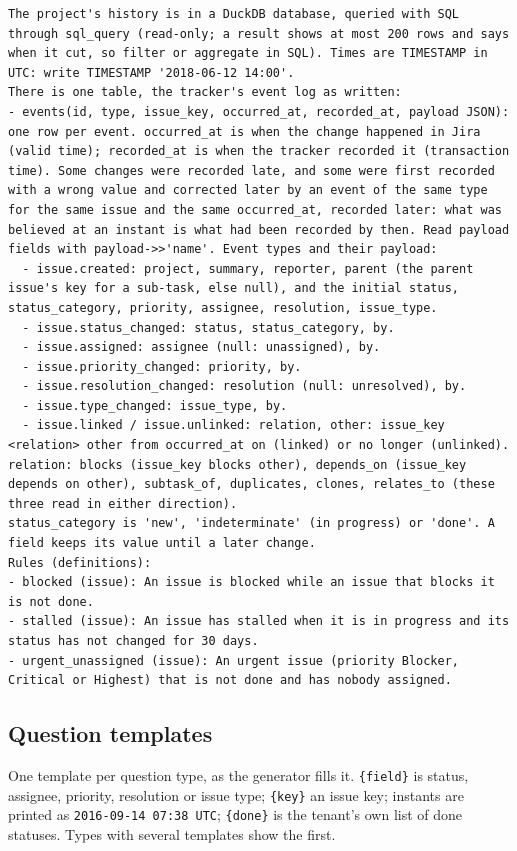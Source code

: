 \documentclass[sigconf, nonacm]{acmart}
\newcommand{\code}[1]{\texttt{#1}}
\begin{document}
\begin{lstlisting}
The project's history is in a DuckDB database, queried with SQL through sql_query (read-only; a result shows at most 200 rows and says when it cut, so filter or aggregate in SQL). Times are TIMESTAMP in UTC: write TIMESTAMP '2018-06-12 14:00'.
There is one table, the tracker's event log as written:
- events(id, type, issue_key, occurred_at, recorded_at, payload JSON): one row per event. occurred_at is when the change happened in Jira (valid time); recorded_at is when the tracker recorded it (transaction time). Some changes were recorded late, and some were first recorded with a wrong value and corrected later by an event of the same type for the same issue and the same occurred_at, recorded later: what was believed at an instant is what had been recorded by then. Read payload fields with payload->>'name'. Event types and their payload:
  - issue.created: project, summary, reporter, parent (the parent issue's key for a sub-task, else null), and the initial status, status_category, priority, assignee, resolution, issue_type.
  - issue.status_changed: status, status_category, by.
  - issue.assigned: assignee (null: unassigned), by.
  - issue.priority_changed: priority, by.
  - issue.resolution_changed: resolution (null: unresolved), by.
  - issue.type_changed: issue_type, by.
  - issue.linked / issue.unlinked: relation, other: issue_key <relation> other from occurred_at on (linked) or no longer (unlinked). relation: blocks (issue_key blocks other), depends_on (issue_key depends on other), subtask_of, duplicates, clones, relates_to (these three read in either direction).
status_category is 'new', 'indeterminate' (in progress) or 'done'. A field keeps its value until a later change.
Rules (definitions):
- blocked (issue): An issue is blocked while an issue that blocks it is not done.
- stalled (issue): An issue has stalled when it is in progress and its status has not changed for 30 days.
- urgent_unassigned (issue): An urgent issue (priority Blocker, Critical or Highest) that is not done and has nobody assigned.
\end{lstlisting}

\subsection{Question templates}
\label{app:templates}

One template per question type, as the generator fills it. \code{\{field\}} is status, assignee, priority, resolution or issue type; \code{\{key\}} an issue key; instants are printed as \code{2016-09-14 07:38 UTC}; \code{\{done\}} is the tenant's own list of done statuses. Types with several templates show the first.
\end{document}
